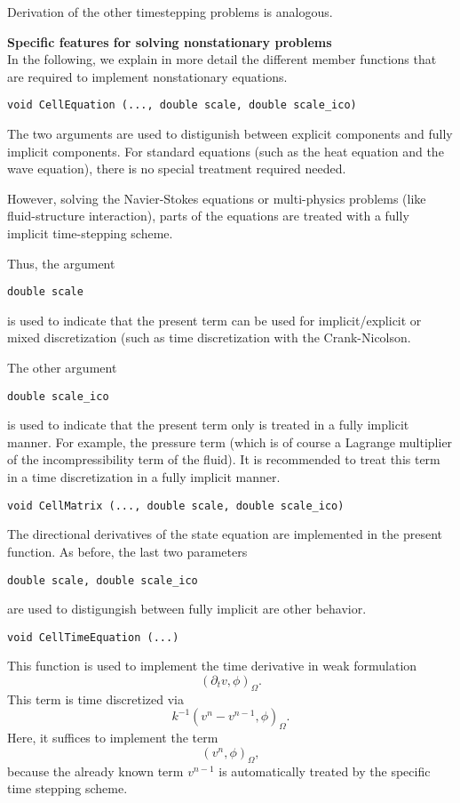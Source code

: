 Derivation of the other timestepping problems is analogous.


\textbf{Specific features for 
solving nonstationary problems}\\

In the following, we explain in more detail the 
different member functions that are required to
implement nonstationary equations.

\begin{verbatim}
void CellEquation (..., double scale, double scale_ico)
\end{verbatim}
The two arguments 
are used to distigunish between explicit 
components and fully implicit components. 
For standard equations (such as the heat 
equation and the wave equation), there is 
no special treatment required needed. 

However, solving the Navier-Stokes equations or 
multi-physics problems (like fluid-structure
interaction), parts of the equations are treated
with a fully implicit time-stepping scheme.

Thus, the argument
\begin{verbatim}
double scale
\end{verbatim}
is used to indicate that the present term 
can be used for implicit/explicit or mixed 
discretization (such as time discretization with
the Crank-Nicolson.

The other argument
\begin{verbatim}
double scale_ico
\end{verbatim} 
is used to indicate that the present term 
only is treated in a fully implicit manner. 
For example, the pressure term (which is of course
a Lagrange multiplier of the incompressibility 
term of the fluid). It is recommended to treat 
this term in a time discretization in a fully 
implicit manner. 

\begin{verbatim}
void CellMatrix (..., double scale, double scale_ico)
\end{verbatim}
The directional derivatives of the state equation
are implemented in the present function. As before,
the last two parameters
\begin{verbatim}
double scale, double scale_ico
\end{verbatim} 
are used to distigungish between fully implicit 
are other behavior. 

\begin{verbatim}
void CellTimeEquation (...) 
\end{verbatim}
This function is used to implement the 
time derivative in weak formulation 
\begin{equation*}
(\partial_t v, \phi)_{\Omega}.
\end{equation*}
This term is time discretized via
\begin{equation*}
k^{-1} (v^n - v^{n-1} , \phi)_{\Omega}. 
\end{equation*}
Here, it suffices to implement the term
\begin{equation*}
(v^n, \phi)_{\Omega},
\end{equation*}
because the already known term $v^{n-1}$ is 
automatically treated by the specific time
stepping scheme. 

